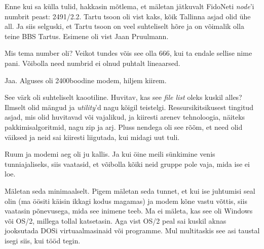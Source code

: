 Enne kui sa külla tulid, hakkasin mõtlema, et mäletan jätkuvalt FidoNeti 
\emph{node}'i numbrit peast: 2491/2.2. Tartu tsoon oli vist 
kaks, kõik Tallinna asjad olid ühe all. Ja siis selguski, et Tartu tsoon on veel 
suhteliselt hõre ja on võimalik olla teine BBS Tartus. Esimene oli vist Jaan 
Pruulmann.


Mis tema number oli? Veikot tundes võis see olla 666, kui ta endale
sellise nime pani. Võibolla need numbrid ei olnud puhtalt lineaarsed. 


Jaa. Alguses oli 2400boodine modem, hiljem kiirem.


See värk oli suhteliselt kaootiline. Huvitav, kas see \emph{file 
list} oleks kuskil alles? Ilmselt olid mängud ja
\emph{utility}'d nagu kõigil teistelgi. Ressursikitsikusest tingitud
asjad, mis olid huvitavad või vajalikud, ja kiiresti arenev tehnoloogia, näiteks 
pakkimisalgoritmid, nagu zip ja arj. Pluss nendega 
oli see rõõm, et need olid väiksed ja neid sai kiiresti liigutada, kui midagi uut 
tuli.


Ruum ja modemi aeg oli ju kallis. Ja kui 
öine meili sünkimine venis tunniajaliseks, siis vaatasid, et 
võibolla kõiki neid gruppe pole vaja, mida ise ei loe. 


Mäletan seda minimaalselt. 
Pigem mäletan seda tunnet, et kui ise juhtumisi seal olin (ma öösiti 
käisin ikkagi kodus magamas) ja modem kõne vastu võttis, siis vaatasin
põnevusega, mida see inimene teeb. Ma ei mäleta, kas see oli 
Windows või OS/2, millega tollal katsetasin. Aga 
vist OS/2 peal sai kuskil aknas jooksutada DOSi virtuaalmasinaid või programme. Mul multitaskis see asi taustal isegi siis, kui tööd tegin.

